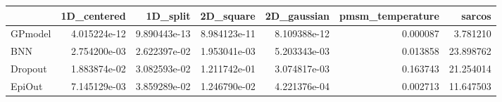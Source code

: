 \begin{tabular}{lrrrrrr}
\toprule
{} &   1D\_centered &      1D\_split &     2D\_square &   2D\_gaussian &  pmsm\_temperature &     sarcos \\
\midrule
GPmodel &  4.015224e-12 &  9.890443e-13 &  8.984123e-11 &  8.109388e-12 &          0.000087 &   3.781210 \\
BNN     &  2.754200e-03 &  2.622397e-02 &  1.953041e-03 &  5.203343e-03 &          0.013858 &  23.898762 \\
Dropout &  1.883874e-02 &  3.082593e-02 &  1.211742e-01 &  3.074817e-03 &          0.163743 &  21.254014 \\
EpiOut  &  7.145129e-03 &  3.859289e-02 &  1.246790e-02 &  4.221376e-04 &          0.002713 &  11.647503 \\
\bottomrule
\end{tabular}
